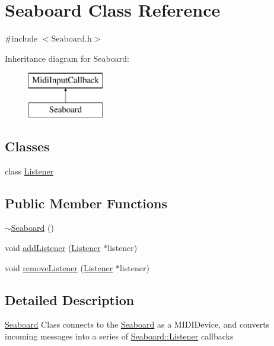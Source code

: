 \hypertarget{class_seaboard}{\section{Seaboard Class Reference}
\label{class_seaboard}
}


{\ttfamily \#include $<$Seaboard.\-h$>$}

Inheritance diagram for Seaboard\-:\begin{figure}[H]
\begin{center}
\leavevmode
\includegraphics[height=2.000000cm]{class_seaboard}
\end{center}
\end{figure}
\subsection*{Classes}
\begin{DoxyCompactItemize}
\item 
class \hyperlink{class_seaboard_1_1_listener}{Listener}
\end{DoxyCompactItemize}
\subsection*{Public Member Functions}
\begin{DoxyCompactItemize}
\item 
\hyperlink{class_seaboard_a743d5d77a721161d976c94826d9831e0}{$\sim$\-Seaboard} ()
\item 
void \hyperlink{class_seaboard_a42baffad758f8eda105157b56234c668}{add\-Listener} (\hyperlink{class_seaboard_1_1_listener}{Listener} $\ast$listener)
\item 
void \hyperlink{class_seaboard_ad66eafdd9aa94c203f8634598d74bcaf}{remove\-Listener} (\hyperlink{class_seaboard_1_1_listener}{Listener} $\ast$listener)
\end{DoxyCompactItemize}


\subsection{Detailed Description}
\hyperlink{class_seaboard}{Seaboard} Class connects to the \hyperlink{class_seaboard}{Seaboard} as a M\-I\-D\-I\-Device, and converts incoming messages into a series of \hyperlink{class_seaboard_1_1_listener}{Seaboard\-::\-Listener} callbacks

